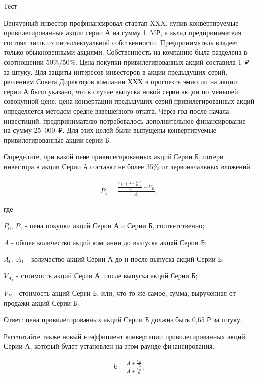 \documentclass[12pt, table]{exam}
\begin{document}
\setcounter{section}{0\relax}%
\noindent
\normalsize

\begin{questions}
\question[40] Тест
\answerstotest
	
\question[20]
Венчурный инвестор профинансировал стартап XXX, купив конвертируемые привилегированные акции серии А на сумму 1~M₽, а вклад предпринимателя состоял лишь из интеллектуальной собственности. Предприниматель владеет только обыкновенными акциями. Собственность на компанию была разделена в соотношении 50\%/50\%. Цена покупки привилегированных акций составила 1~₽ за штуку.
Для защиты интересов инвесторов в акции предыдущих серий, решением Совета Директоров компании ХХХ в проспекте эмиссии на акции серии А было указано, что в случае выпуска новой серии акции по меньшей совокупной цене, цена конвертации предыдущих серий привилегированных акций определяется методом средне-взвешенного отката.
Через год после начала инвестиций, предпринимателю потребовалось дополнительное финансирование на сумму  25~000~₽.
Для этих целей были выпущены конвертируемые привилегированные акции серии Б.
\noaddpoints
\pagebreak
\begin{subparts}
\subpart[10] Определите, при какой цене привилегированных акций Серии Б, потери инвестора в акции Серии А составят не более 35\% от первоначальных вложений.
\begin{solution}[18em]
	\begin{align}
	P_1=\frac{\frac{V_{A_1} \cdot (A + \frac{V_B}{P_0})}{A_0}-V_B}{A},
	\end{align}
	
	где
	
	$P_0$, $P_1$ - цена покупки акций Серии А и Серии Б, соответственно;
	
	$A$ - общее количество акций компании до выпуска акций Серии Б;
	
	$A_0$, $A_1$ - количество акций Серии А до и после выпуска акций Серии Б;
	
	$V_{A_1}$ - стоимость акций Серии А, после выпуска акций Серии Б;
	
	$V_B$ - стоимость акций Серии Б, или, что то же самое, сумма, вырученная от продажи акций Серии Б.
	
	Ответ: цена привилегированных акций Серии Б должна быть  0,65 ₽ 
	 за штуку.					
\end{solution}

\subpart[5] Рассчитайте также новый коэффициент конвертации привилегированных акций Серии А, который будет установлен на этом раунде финансирования.
\begin{solution}[9em]
	\begin{align}
	k=\frac{A+\frac{V_B}{P_0}}{A+\frac{V_B}{P_1}},
	\end{align}
	

\end{solution}
\end{subparts}
\end{questions}
\end{document}
